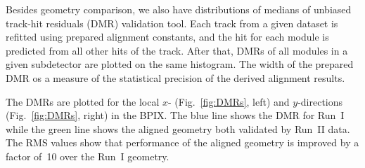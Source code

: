 Besides geometry comparison, we also have distributions of medians of unbiased track-hit residuals (DMR) validation tool. Each track from a given dataset is refitted using prepared alignment constants, and the hit for each module is predicted from all other hits of the track. After that, DMRs of all modules in a given subdetector are plotted on the same histogram. The width of the prepared DMR os a measure of the statistical precision of the derived alignment results. 


The DMRs are plotted for the local $x$- (Fig.~\ref{fig:DMRs}, left) and $y$-directions (Fig.~\ref{fig:DMRs}, right) in the BPIX. The blue line shows the DMR for Run~I while the green line shows the aligned geometry both validated by Run~II data. The RMS values show that performance of the aligned geometry is improved by a factor of~10 over the Run~I geometry.

